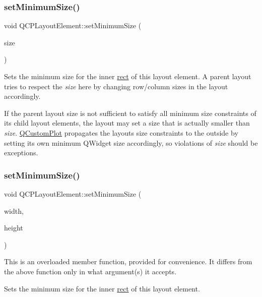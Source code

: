 \subsubsection{\texorpdfstring{set\+Minimum\+Size()}{setMinimumSize()}\hspace{0.1cm}{\footnotesize\ttfamily [1/2]}}
{\footnotesize\ttfamily void Q\+C\+P\+Layout\+Element\+::set\+Minimum\+Size (\begin{DoxyParamCaption}\item[{const Q\+Size \&}]{size }\end{DoxyParamCaption})}

Sets the minimum size for the inner \hyperlink{class_q_c_p_layout_element_a208effccfe2cca4a0eaf9393e60f2dd4}{rect} of this layout element. A parent layout tries to respect the {\itshape size} here by changing row/column sizes in the layout accordingly.

If the parent layout size is not sufficient to satisfy all minimum size constraints of its child layout elements, the layout may set a size that is actually smaller than {\itshape size}. \hyperlink{class_q_custom_plot}{Q\+Custom\+Plot} propagates the layout\textquotesingle{}s size constraints to the outside by setting its own minimum Q\+Widget size accordingly, so violations of {\itshape size} should be exceptions. \mbox{\label{class_q_c_p_layout_element_a8e0447614a0bf92de9a7304588c6b96e}} 
\subsubsection{\texorpdfstring{set\+Minimum\+Size()}{setMinimumSize()}\hspace{0.1cm}{\footnotesize\ttfamily [2/2]}}
{\footnotesize\ttfamily void Q\+C\+P\+Layout\+Element\+::set\+Minimum\+Size (\begin{DoxyParamCaption}\item[{int}]{width,  }\item[{int}]{height }\end{DoxyParamCaption})}

This is an overloaded member function, provided for convenience. It differs from the above function only in what argument(s) it accepts.

Sets the minimum size for the inner \hyperlink{class_q_c_p_layout_element_a208effccfe2cca4a0eaf9393e60f2dd4}{rect} of this layout element. \mbox{\label{class_q_c_p_layout_element_a38975ea13e36de8e53391ce41d94bc0f}} 
